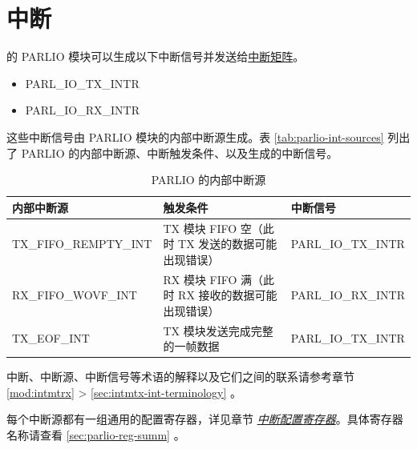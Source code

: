 \documentclass[main\_\_CN.tex]{subfiles}
\begin{document}

\section{中断} \label{sec:parlio-interrupts}

\chipname{} 的 PARLIO 模块可以生成以下中断信号并发送给\hyperref[mod:intmtrx]{中断矩阵}。

    \begin{itemize}
        \item PARL\_IO\_TX\_INTR
        \item PARL\_IO\_RX\_INTR
    \end{itemize}

这些中断信号由 PARLIO 模块的内部中断源生成。表 \ref{tab:parlio-int-sources} 列出了 PARLIO 的内部中断源、中断触发条件、以及生成的中断信号。

\begin{longtable}{ | L{3.8cm} | L{8.5cm} | L{3.2cm} | }
\caption{PARLIO 的内部中断源} \label{tab:parlio-int-sources}
\\ \hline
{}
\textbf{内部中断源} & \textbf{触发条件}  &  \textbf{中断信号}\\ \hline
\label{int:TXFIFOREMPTYINT}TX\_FIFO\_REMPTY\_INT  &  TX 模块 FIFO 空（此时 TX 发送的数据可能出现错误） &  PARL\_IO\_TX\_INTR \\ \hline
\label{int:RXFIFOWOVFINT}RX\_FIFO\_WOVF\_INT &  RX 模块 FIFO 满（此时 RX 接收的数据可能出现错误） & PARL\_IO\_RX\_INTR \\ \hline
\label{int:TXEOFINT}TX\_EOF\_INT &  TX 模块发送完成完整的一帧数据 & PARL\_IO\_TX\_INTR \\ \hline
\end{longtable}

\begin{tiplisting}
中断、中断源、中断信号等术语的解释以及它们之间的联系请参考章节 \ref{mod:intmtrx} \textit{} > \ref{sec:intmtx-int-terminology} \textit{}。
\end{tiplisting}

每个中断源都有一组通用的配置寄存器，详见章节 \hyperref[interrupt-config-registers]{\textit{中断配置寄存器}}。具体寄存器名称请查看 \ref{sec:parlio-reg-summ} \textit{}。


\end{document}
